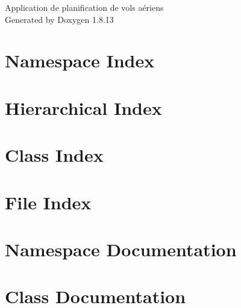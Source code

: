 \documentclass[twoside]{book}
\newcommand{\+}{\discretionary{\mbox{\scriptsize$\hookleftarrow$}}{}{}}
\newcommand{\clearemptydoublepage}{%
  \newpage{\pagestyle{empty}\cleardoublepage}%
}
\begin{document}
\hypersetup{pageanchor=false,
             bookmarksnumbered=true,
             pdfencoding=unicode
            }
\begin{titlepage}
\vspace*{7cm}
\begin{center}%
{\Large Application de planification de vols aériens }\\
\vspace*{1cm}
{\large Generated by Doxygen 1.8.13}\\
\end{center}
\end{titlepage}
\clearemptydoublepage
{}
\tableofcontents
\clearemptydoublepage
{}
\hypersetup{pageanchor=true}

\chapter{Namespace Index}

\chapter{Hierarchical Index}

\chapter{Class Index}

\chapter{File Index}

\chapter{Namespace Documentation}

\chapter{Class Documentation}













\end{document}
